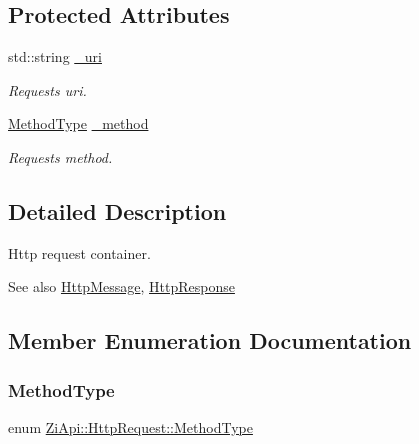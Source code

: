\subsection*{Protected Attributes}
\begin{DoxyCompactItemize}
\item 
\mbox{\label{structZiApi_1_1HttpRequest_a30de96436841e7f49ce9d9f6a69f751e}} 
std\+::string \mbox{\hyperlink{structZiApi_1_1HttpRequest_a30de96436841e7f49ce9d9f6a69f751e}{\+\_\+uri}}
\begin{DoxyCompactList}\small\item\em Request\textquotesingle{}s uri. \end{DoxyCompactList}\item 
\mbox{\label{structZiApi_1_1HttpRequest_ad4e4fe2662f4699ad6715fc11bf454df}} 
\mbox{\hyperlink{structZiApi_1_1HttpRequest_a8592cff867cbbc5cc43bd3a4d6053a1b}{Method\+Type}} \mbox{\hyperlink{structZiApi_1_1HttpRequest_ad4e4fe2662f4699ad6715fc11bf454df}{\+\_\+method}}
\begin{DoxyCompactList}\small\item\em Request\textquotesingle{}s method. \end{DoxyCompactList}\end{DoxyCompactItemize}


\subsection{Detailed Description}
Http request container. 

\begin{DoxySeeAlso}{See also}
\mbox{\hyperlink{classZiApi_1_1HttpMessage}{Http\+Message}}, \mbox{\hyperlink{structZiApi_1_1HttpResponse}{Http\+Response}} 
\end{DoxySeeAlso}


\subsection{Member Enumeration Documentation}
\mbox{\label{structZiApi_1_1HttpRequest_a8592cff867cbbc5cc43bd3a4d6053a1b}} 
\subsubsection{\texorpdfstring{MethodType}{MethodType}}
{\footnotesize\ttfamily enum \mbox{\hyperlink{structZiApi_1_1HttpRequest_a8592cff867cbbc5cc43bd3a4d6053a1b}{Zi\+Api\+::\+Http\+Request\+::\+Method\+Type}}\hspace{0.3cm}{\ttfamily [strong]}}

